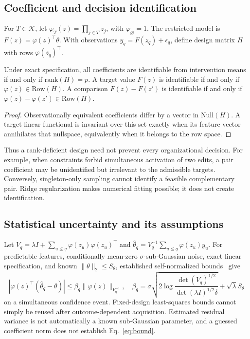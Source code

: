 \documentclass[runningheads]{llncs}
\newcommand{\family}{\mathcal K}
\begin{document}
\subsection{Coefficient and decision identification}
For $T\in\family$, let $\varphi_T(z)=\prod_{j\in T}z_j$, with $\varphi_\varnothing=1$. The restricted model is $F(z)=\varphi(z)^\top\theta$. With observations $y_q=F(z_q)+\epsilon_q$, define design matrix $H$ with rows $\varphi(z_q)^\top$.
\begin{proposition}\label{prop:identification}
    Under exact specification, all coefficients are identifiable from intervention means if and only if $\mathrm{rank}(H)=p$. A target value $F(z)$ is identifiable if and only if $\varphi(z)\in\mathrm{Row}(H)$. A comparison $F(z)-F(z')$ is identifiable if and only if $\varphi(z)-\varphi(z')\in\mathrm{Row}(H)$.
\end{proposition}
\begin{proof}
    Observationally equivalent coefficients differ by a vector in $\mathrm{Null}(H)$. A target linear functional is invariant over this set exactly when its feature vector annihilates that nullspace, equivalently when it belongs to the row space.
\end{proof}
Thus a rank-deficient design need not prevent every organizational decision. For example, when constraints forbid simultaneous activation of two edits, a pair coefficient may be unidentified but irrelevant to the admissible targets. Conversely, singleton-only sampling cannot identify a feasible complementary pair. Ridge regularization makes numerical fitting possible; it does not create identification.

\subsection{Statistical uncertainty and its assumptions}
Let $V_q=\lambda I+\sum_{u\le q}\varphi(z_u)\varphi(z_u)^\top$ and $\hat\theta_q=V_q^{-1}\sum_{u\le q}\varphi(z_u)y_u$. For predictable features, conditionally mean-zero $\sigma$-sub-Gaussian noise, exact linear specification, and known $\|\theta\|_2\le S_\theta$, established self-normalized bounds~\cite{linear} give
\begin{equation}\label{eq:bound}
    |\varphi(z)^\top(\hat\theta_q-\theta)|\le \beta_q\|\varphi(z)\|_{V_q^{-1}},\quad
    \beta_q=\sigma\sqrt{2\log\frac{\det(V_q)^{1/2}}{\det(\lambda I)^{1/2}\delta}}+\sqrt\lambda S_\theta
\end{equation}
on a simultaneous confidence event. Fixed-design least-squares bounds cannot simply be reused after outcome-dependent acquisition. Estimated residual variance is not automatically a known sub-Gaussian parameter, and a guessed coefficient norm does not establish Eq.~\eqref{eq:bound}.
\end{document}
